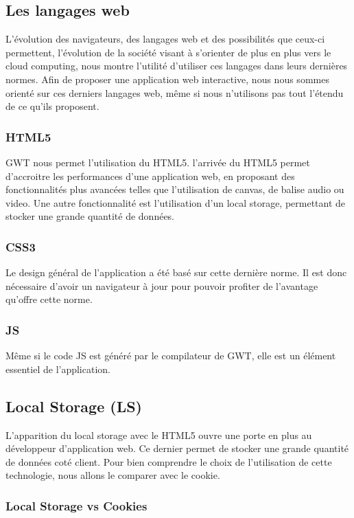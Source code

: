 \subsection{Les langages web}
L'évolution des navigateurs, des langages web et des possibilités que ceux-ci permettent, l'évolution de la société visant à s'orienter de plus en plus vers le cloud computing, nous montre l'utilité d'utiliser ces langages dans leurs dernières normes. Afin de proposer une application web interactive, nous nous sommes orienté sur ces derniers langages web, même si nous n'utilisons pas tout l'étendu de ce qu'ils proposent.

\subsubsection{HTML5}
GWT nous permet l'utilisation du HTML5. l'arrivée du HTML5 permet d'accroitre les performances d'une application web, en proposant des fonctionnalités plus avancées telles que l'utilisation de canvas, de balise audio ou video. Une autre fonctionnalité est l'utilisation d'un local storage, permettant de stocker une grande quantité de données.
\subsubsection{CSS3}
Le design général de l'application a été basé sur cette dernière norme. Il est donc nécessaire d'avoir un navigateur à jour pour pouvoir profiter de l'avantage qu'offre cette norme.

\subsubsection{JS}
Même si le code JS est généré par le compilateur de GWT, elle est un élément essentiel de l'application. 
 
\subsection{Local Storage (LS)}
L'apparition du local storage avec le HTML5 ouvre une porte en plus au développeur d'application web. Ce dernier permet de stocker une grande quantité de données coté client. Pour bien comprendre le choix de l'utilisation de cette technologie, nous allons le comparer avec le cookie.

\subsubsection{Local Storage vs Cookies}


